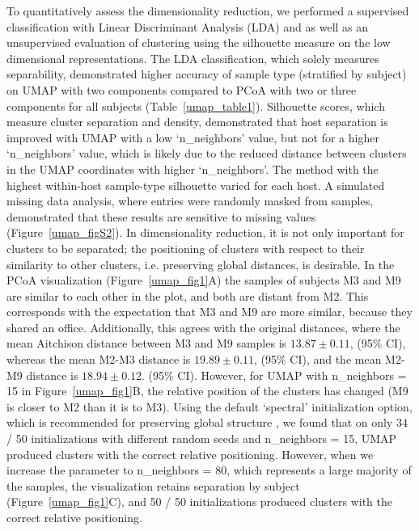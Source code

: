 To quantitatively assess the dimensionality reduction, we performed a supervised classification with Linear Discriminant Analysis (LDA) and as well as an unsupervised evaluation of clustering using the silhouette measure on the low dimensional representations. The LDA classification, which solely measures separability, demonstrated higher accuracy of sample type (stratified by subject) on UMAP with two components compared to PCoA with two or three components for all subjects (Table~\ref{umap_table1}). Silhouette scores, which measure cluster separation and density, demonstrated that host separation is improved with UMAP with a low `n\_neighbors' value, but not for a higher `n\_neighbors' value, which is likely due to the reduced distance between clusters in the UMAP coordinates with higher `n\_neighbors'. The method with the highest within-host sample-type silhouette varied for each host. A simulated missing data analysis, where entries were randomly masked from samples, demonstrated that these results are sensitive to missing values (Figure~\ref{umap_figS2}).
In dimensionality reduction, it is not only important for clusters to be separated; the positioning of clusters with respect to their similarity to other clusters, i.e. preserving global distances, is desirable. In the PCoA visualization (Figure~\ref{umap_fig1}A) the samples of subjects M3 and M9 are similar to each other in the plot, and both are distant from M2. This corresponds with the expectation that M3 and M9 are more similar, because they shared an office. Additionally, this agrees with the original distances, where the mean Aitchison distance between M3 and M9 samples is $13.87 \pm 0.11$, (95\% CI), whereas the mean M2-M3 distance is $19.89 \pm 0.11$, (95\% CI), and the mean M2-M9 distance is $18.94 \pm 0.12$. (95\% CI). However, for UMAP with n\_neighbors = 15 in Figure~\ref{umap_fig1}B,  the relative position of the clusters has changed (M9 is closer to M2 than it is to M3). Using the default ‘spectral’ initialization option, which is recommended for preserving global structure \cite{Kobak2021-ih}, we found that on only 34 / 50  initializations with different random seeds and n\_neighbors = 15, UMAP produced clusters with the correct relative positioning. However, when we increase the parameter to n\_neighbors = 80, which represents a large majority of the samples, the visualization retains separation by subject (Figure~\ref{umap_fig1}C), and 50 / 50 initializations produced clusters with the correct relative positioning.

